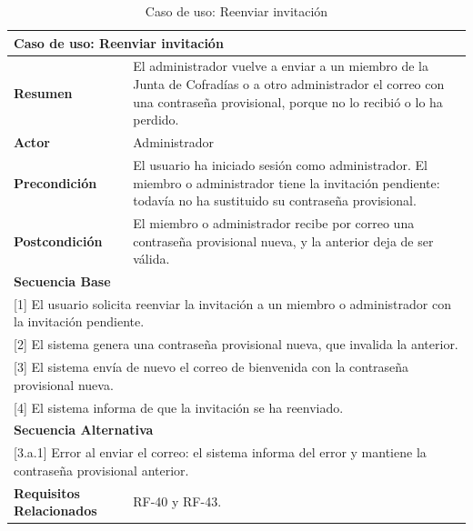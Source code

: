 \begin{table}[h!]
    \centering
    \renewcommand{\arraystretch}{1.5}

    \begin{tabular}{|p{4cm}|p{11cm}|}
        \hline
        \multicolumn{2}{|l|}{\textbf{Caso de uso: Reenviar invitación}} \\
        \hline
        \textbf{Resumen} & El administrador vuelve a enviar a un miembro de la Junta de Cofradías o a otro administrador el correo con una contraseña provisional, porque no lo recibió o lo ha perdido. \\
        \hline
        \textbf{Actor} & Administrador \\
        \hline
        \textbf{Precondición} & El usuario ha iniciado sesión como administrador. El miembro o administrador tiene la invitación pendiente: todavía no ha sustituido su contraseña provisional. \\
        \hline
        \textbf{Postcondición} & El miembro o administrador recibe por correo una contraseña provisional nueva, y la anterior deja de ser válida. \\
        \hline
        \multicolumn{2}{|l|}{\textbf{Secuencia Base}} \\
        \hline
        \multicolumn{2}{|p{15cm}|}{ [1] El usuario solicita reenviar la invitación a un miembro o administrador con la invitación pendiente. } \\
        \hline
        \multicolumn{2}{|p{15cm}|}{ [2] El sistema genera una contraseña provisional nueva, que invalida la anterior. } \\
        \hline
        \multicolumn{2}{|p{15cm}|}{ [3] El sistema envía de nuevo el correo de bienvenida con la contraseña provisional nueva. } \\
        \hline
        \multicolumn{2}{|p{15cm}|}{ [4] El sistema informa de que la invitación se ha reenviado. } \\
        \hline
        \multicolumn{2}{|l|}{\textbf{Secuencia Alternativa}} \\
        \hline
        \multicolumn{2}{|p{15cm}|}{ [3.a.1] Error al enviar el correo: el sistema informa del error y mantiene la contraseña provisional anterior. } \\
        \hline
        \textbf{Requisitos Relacionados} & RF-40 y RF-43. \\
        \hline
    \end{tabular}
    \caption{Caso de uso: Reenviar invitación}
\end{table}

